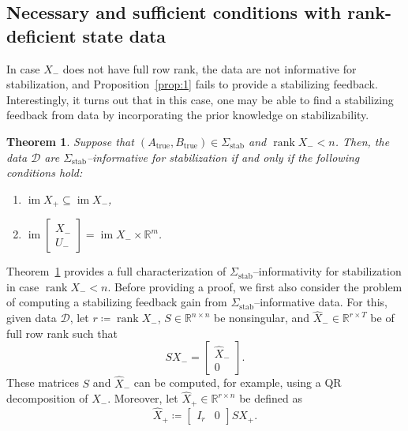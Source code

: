 \documentclass[9pt,shortpaper,twoside,web]{ieeecolor}
\DeclareMathOperator{\rank}{rank}
\DeclareMathOperator{\im}{im}
\newtheorem{theorem}{Theorem}
\begin{document}
\subsection{Necessary and sufficient conditions with rank-deficient state data}
\label{sec:IV-B}

In case $X_-$ does not have full row rank, the data are not informative for stabilization, and Proposition~\ref{prop:1} fails to provide a stabilizing feedback. Interestingly, it turns out that in this case, one may be able to find a stabilizing feedback from data by incorporating the prior knowledge on stabilizability. 

\begin{theorem}
\label{th:3}
Suppose that $(A_\text{true},\!B_\text{true})\!\in\!\Sigma_\text{stab}$ and $\rank X_-\!<\!n$. Then, the data $\mathcal{D}$ are $\Sigma_\text{stab}$--informative for stabilization \emph{if and only if} the following conditions hold:
\begin{enumerate}[label=(\alph*),ref=\ref{th:3}(\alph*)]
    \item\label{th:3(a)} $\im X_+\subseteq\im X_-$,
    \item\label{th:3(b)} $\im \begin{bmatrix}
    X_- \\ U_-
    \end{bmatrix}=\im X_- \times \mathbb{R}^m$.
\end{enumerate}
\end{theorem}\vspace{0.25cm}

Theorem~\ref{th:3} provides a full characterization of $\Sigma_\text{stab}$--informativity for stabilization in case $\rank X_-<n$. Before providing a proof, we first also consider the problem of computing a stabilizing feedback gain from $\Sigma_\text{stab}$--informative data. For this, given data $\mathcal{D}$, let \mbox{$r\coloneqq \rank X_-$}, $S\in\mathbb{R}^{n\times n}$ be nonsingular, and \mbox{$\hat{X}_- \in \mathbb{R}^{r \times T}$} be of full row rank such that
\begin{equation}
\label{eq:def:SXhat_-}
SX_-=\begin{bmatrix}
\hat{X}_- \\ 0
\end{bmatrix}.
\end{equation}
These matrices $S$ and $\hat{X}_-$ can be computed, for example, using a QR decomposition of $X_-$. Moreover, let $\hat{X}_+\in\mathbb{R}^{r\times n}$ be defined as
\begin{equation}
\label{eq:def:SXhat_+}
\hat{X}_+\coloneqq\begin{bmatrix}
I_r & 0
\end{bmatrix}SX_+.
\end{equation}
\end{document}
